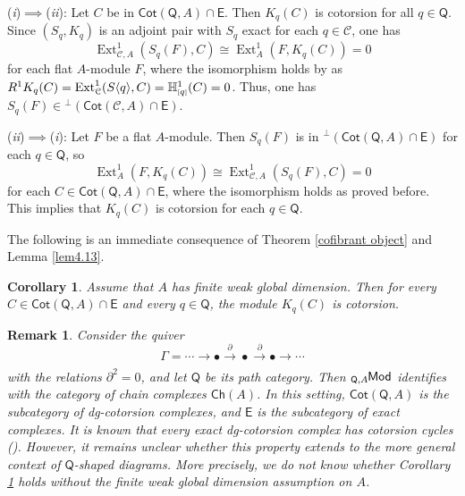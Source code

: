 \documentclass{amsart}
\theoremstyle{bfupright head,slanted body}
\theoremstyle{bfupright head,upright body}
\theoremstyle{fixed bf head,slanted body}
\newtheorem{cor}[res]{Corollary}        \newtheorem*{cor*}{Corollary}
\theoremstyle{fixed bf head,upright body}
\newtheorem{rmk}[res]{Remark}           \newtheorem*{rmk*}{Remark}
\theoremstyle{numbered paragraph}
\newcounter{eqc}
\newenvironment{prf*}[1][Proof]{%
	\begin{proof}[\bf #1]
		\setcounter{equation}{0}
		\renewcommand{\theequation}{\arabic{equation}}}
	{\end{proof}
}
\newcommand{\eqclbl}[1]{{\upshape(\textit{#1})}}
\newcommand{\proofofimp}[3][:]{\mbox{\eqclbl{#2}$\!\implies\!$\eqclbl{#3}#1}}
\numberwithin{equation}{res}
\newcommand{\Cot}[1]{\mathsf{Cot}(#1)}
\newcommand{\xra}[2][]{\xrightarrow[#1]{\:#2\:}}
\newcommand{\Ext}[4][]{\operatorname{Ext}_{#1}^{#2}(#3,#4)}
\newcommand{\cH}[2][1]{\mathbb{H}^{#1}_{\textnormal{\tiny[}#2\textnormal{\tiny]}}}
\newcommand{\E}{\mathsf{E}}
\newcommand{\C}{\mathcal{C}}
\newcommand{\Q}{\mathsf{Q}}
\newcommand{\is}{\cong}
\newcommand{\lMod}[1]{{}_{#1}\mspace{-1mu}{\sf{Mod}}}
\begin{document}
\begin{prf*}
\proofofimp{i}{ii} Let $C$ be in $\Cot{\Q,A}\cap\E$. Then $K_q(C)$ is cotorsion for all $q\in\Q$. Since $(S_q,K_q)$ is an adjoint pair with $S_q$ exact for each $q\in\C$, one has
\[
\Ext[\C,A]{1}{S_q(F)}{C} \is \Ext[A]{1}{F}{K_q(C)} = 0
\]
for each flat $A$-module $F$, where the isomorphism holds by \cite[Lemma 1.3]{HJ19b} as $R^1K_q(C)=\Ext[\C]{1}{S\langle q\rangle}{C}=\cH[1]{q}(C)=0$. Thus, one has $S_q(F)\in{^\perp(\Cot{\C,A}\cap\E)}$.

\proofofimp{ii}{i} Let $F$ be a flat $A$-module. Then $S_q(F)$ is in $^\perp(\Cot{\Q,A}\cap\E)$ for each $q\in\Q$, so
\[
\Ext[A]{1}{F}{K_q(C)} \is \Ext[\C,A]{1}{S_q(F)}{C} = 0
\]
for each $C\in\Cot{\Q,A}\cap\E$, where the isomorphism holds as proved before. This implies that $K_q(C)$ is cotorsion for each $q\in\Q$.
\end{prf*}

The following is an immediate consequence of Theorem \ref{cofibrant object} and Lemma \ref{lem4.13}.

\begin{cor}\label{dg-cotorsion}
Assume that $A$ has finite weak global dimension. Then for every $C\in\Cot{\Q,A}\cap\E$ and every $q\in\Q$, the module $K_q(C)$ is cotorsion.
\end{cor}

\begin{rmk}
Consider the quiver
$$\Gamma=\cdots \to \bullet \xra{\partial} \bullet \xra{\partial} \bullet \to \cdots$$
with the relations $\partial^2=0$, and let $\Q$ be its path category. Then $\lMod{\Q,A}$ identifies with the category of chain complexes $\mathsf{Ch}(A)$.
In this setting, $\Cot{\Q,A}$ is the subcategory of dg-cotorsion complexes, and $\E$ is the subcategory of exact complexes. It is known that every exact dg-cotorsion complex has cotorsion cycles (\cite[Theorem 1.3]{BCE20}). However, it remains unclear whether this property extends to the more general context of $\Q$-shaped diagrams. More precisely, we do not know whether Corollary \ref{dg-cotorsion} holds without the finite weak global dimension assumption on $A$.
\end{rmk}

\end{document}
